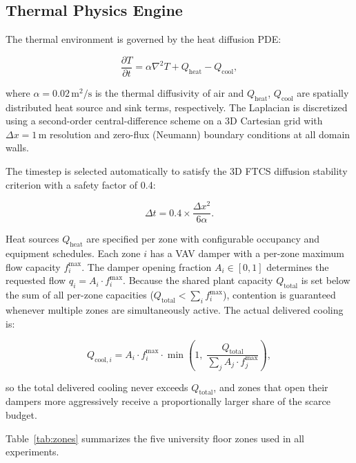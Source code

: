 \documentclass[conference]{IEEEtran}
\begin{document}
\subsection{Thermal Physics Engine}

The thermal environment is governed by the heat diffusion PDE:

\begin{equation}
  \frac{\partial T}{\partial t} =
      \alpha \nabla^2 T
      + Q_{\text{heat}}
      - Q_{\text{cool}},
  \label{eq:pde}
\end{equation}

where $\alpha = 0.02\,\text{m}^2/\text{s}$ is the thermal diffusivity of air
and $Q_{\text{heat}}$, $Q_{\text{cool}}$ are spatially distributed heat source
and sink terms, respectively.  The Laplacian is discretized using a
second-order central-difference scheme on a 3D Cartesian grid with
$\Delta x = 1\,\text{m}$ resolution and zero-flux (Neumann) boundary
conditions at all domain walls.

The timestep is selected automatically to satisfy the 3D FTCS diffusion
stability criterion with a safety factor of 0.4:

\begin{equation}
  \Delta t = 0.4 \times \frac{\Delta x^2}{6\alpha}.
  \label{eq:dt}
\end{equation}

Heat sources $Q_{\text{heat}}$ are specified per zone with configurable
occupancy and equipment schedules.  Each zone $i$ has a VAV damper with a per-zone maximum flow capacity
$f_i^{\max}$.  The damper opening fraction $A_i \in [0,1]$ determines the
requested flow $q_i = A_i \cdot f_i^{\max}$.  Because the shared plant
capacity $Q_{\text{total}}$ is set below the sum of all per-zone capacities
($Q_{\text{total}} < \sum_i f_i^{\max}$), contention is guaranteed whenever
multiple zones are simultaneously active.  The actual delivered cooling is:

\begin{equation}
  Q_{\text{cool},i} = A_i \cdot f_i^{\max} \cdot
    \min\!\left(1,\; \frac{Q_{\text{total}}}{\sum_j A_j \cdot f_j^{\max}}\right),
  \label{eq:cooling}
\end{equation}

so the total delivered cooling never exceeds $Q_{\text{total}}$, and zones
that open their dampers more aggressively receive a proportionally larger
share of the scarce budget.

Table~\ref{tab:zones} summarizes the five university floor zones used in
all experiments.
\end{document}
